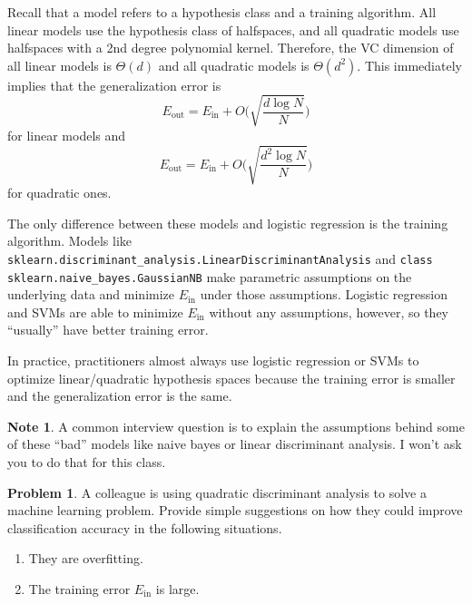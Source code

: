 \documentclass[10pt]{exam}
\theoremstyle{definition}
\newtheorem{problem}{Problem}
\newtheorem{note}{Note}
\newtheorem{fact}{Fact}
\newcommand{\Ein}{E_{\text{in}}}
\newcommand{\Eout}{E_{\text{out}}}
\begin{document}
    Recall that a model refers to a hypothesis class and a training algorithm.
    All linear models use the hypothesis class of halfspaces, and all quadratic models use halfspaces with a 2nd degree polynomial kernel.
    Therefore, the VC dimension of all linear models is $\Theta(d)$ and all quadratic models is $\Theta(d^2)$.
    This immediately implies that the generalization error is
    \begin{equation}
        \Eout = \Ein + O\bigg(\sqrt{\frac{d\log N}{N}}\bigg)
    \end{equation}
    for linear models and
    \begin{equation}
        \Eout = \Ein + O\bigg(\sqrt{\frac{d^2\log N}{N}}\bigg)
    \end{equation}
    for quadratic ones.

    The only difference between these models and logistic regression is the training algorithm.
    Models like \lstinline{sklearn.discriminant_analysis.LinearDiscriminantAnalysis} and \lstinline{class sklearn.naive_bayes.GaussianNB} make parametric assumptions on the underlying data and minimize $\Ein$ under those assumptions.
    Logistic regression and SVMs are able to minimize $\Ein$ without any assumptions, however, so they ``usually'' have better training error.

    In practice, practitioners almost always use logistic regression or SVMs to optimize linear/quadratic hypothesis spaces because the training error is smaller and the generalization error is the same.


    \vspace{5in}
\begin{note}
    A common interview question is to explain the assumptions behind some of these ``bad'' models like naive bayes or linear discriminant analysis.
    I won't ask you to do that for this class.
\end{note}

\newpage
\begin{problem}
    A colleague is using quadratic discriminant analysis to solve a machine learning problem.
    Provide simple suggestions on how they could improve classification accuracy in the following situations.
    \begin{enumerate}
        \item
            They are overfitting.
            \vspace{4in}
        \item
            The training error $\Ein$ is large.
    \end{enumerate}
\end{problem}
\end{document}
